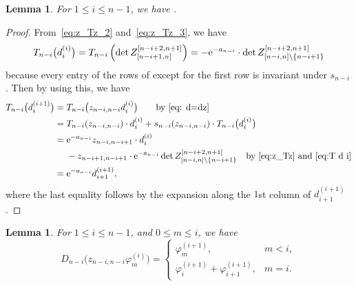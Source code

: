 \documentclass[10pt,a4paper]{amsart}
\numberwithin{equation}{section}
\newtheorem{Lemma}[Theorem]{Lemma}
\theoremstyle{definition}
\begin{document}
\begin{Lemma}\label{lem:T_on_f}
For $1\le i\le n-1$, we have .
\end{Lemma}
\begin{proof}
From~\eqref{eq:z_Tz_2} and~\eqref{eq:z_Tz_3}, we have
\begin{equation}
\label{eq:T d i}
T_{n-i}\bigl(d^{(i)}_{i}\bigr)
=
T_{n-i}\left(\det Z_{[n-i+1,n]}^{[n-i+2,n+1]}\right)=-{\rm e}^{-a_{n-i}}\cdot \det Z_{[n-i,n]\setminus \{n-i+1\}}^{[n-i+2,n+1]}
\end{equation}
because every entry of the rows of  except for the first row is invariant under $s_{n-i}$.
Then by using this, we have
\begin{align*}
T_{n-i}\bigl(d^{(i+1)}_{i}\bigr)={}&T_{n-i}\bigl(z_{n-i,n-i}d^{(i)}_{i}\bigr)\qquad\text{by~\eqref{eq: d=dz}}\\
={}&T_{n-i}(z_{n-i,n-i})\cdot d^{(i)}_{i}
+s_{n-i}(z_{n-i,n-i})\cdot T_{n-i}\bigl(d^{(i)}_{i}\bigr) \\
={}&
{\rm e}^{-a_{n-i}}z_{n-i,n-i+1}\cdot
d^{(i)}_i
\\
&-z_{n-i+1,n-i+1}\cdot {\rm e}^{-a_{n-i}}
\det Z_{[n-i,n]\setminus \{n-i+1\}}^{[n-i+2,n+1]}\quad\text{by~\eqref{eq:z_Tz} and~\eqref{eq:T d i}}\\
={}&{\rm e}^{-a_{n-i}}d^{(i+1)}_{i+1},
\end{align*}
where the last equality follows by the expansion along the $1$st column of $d^{(i+1)}_{i+1}$.
\end{proof}
\begin{Lemma}\label{lem: D z varphi}
For $1\le i\le n-1$,
and $0\le m\le i$, we have
\[
D_{n-i}\bigl(z_{n-i,n-i}\varphi^{(i)}_m\bigr)=
\begin{cases}
\varphi^{(i+1)}_{m}, & m<i,\\
\varphi^{(i+1)}_{i}+\varphi^{(i+1)}_{i+1}, & m=i.
\end{cases}
\]
\end{Lemma}
\end{document}
